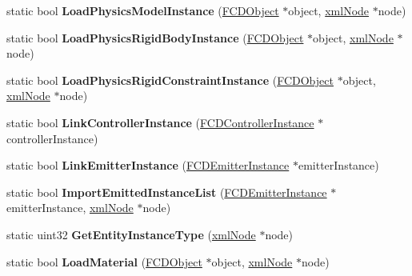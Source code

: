 \begin{DoxyCompactItemize}
\item 
\hypertarget{classFArchiveXML_a601db1bc80cc144e179fef96dd82f6dc}{
static bool {\bfseries LoadPhysicsModelInstance} (\hyperlink{classFCDObject}{FCDObject} $\ast$object, \hyperlink{struct__xmlNode}{xmlNode} $\ast$node)}
\label{classFArchiveXML_a601db1bc80cc144e179fef96dd82f6dc}

\item 
\hypertarget{classFArchiveXML_a844e802b67f84ad81301a339e76d3b7b}{
static bool {\bfseries LoadPhysicsRigidBodyInstance} (\hyperlink{classFCDObject}{FCDObject} $\ast$object, \hyperlink{struct__xmlNode}{xmlNode} $\ast$node)}
\label{classFArchiveXML_a844e802b67f84ad81301a339e76d3b7b}

\item 
\hypertarget{classFArchiveXML_a23d938ee0bf9e6a2b017646b639fee68}{
static bool {\bfseries LoadPhysicsRigidConstraintInstance} (\hyperlink{classFCDObject}{FCDObject} $\ast$object, \hyperlink{struct__xmlNode}{xmlNode} $\ast$node)}
\label{classFArchiveXML_a23d938ee0bf9e6a2b017646b639fee68}

\item 
\hypertarget{classFArchiveXML_aa02dcab5cfd175401750a05d992e1d2b}{
static bool {\bfseries LinkControllerInstance} (\hyperlink{classFCDControllerInstance}{FCDControllerInstance} $\ast$controllerInstance)}
\label{classFArchiveXML_aa02dcab5cfd175401750a05d992e1d2b}

\item 
\hypertarget{classFArchiveXML_a1c77296a350a216bafcd5275447d58fd}{
static bool {\bfseries LinkEmitterInstance} (\hyperlink{classFCDEmitterInstance}{FCDEmitterInstance} $\ast$emitterInstance)}
\label{classFArchiveXML_a1c77296a350a216bafcd5275447d58fd}

\item 
\hypertarget{classFArchiveXML_aa8f1c68e99ccbe83af81a014d7b81fb3}{
static bool {\bfseries ImportEmittedInstanceList} (\hyperlink{classFCDEmitterInstance}{FCDEmitterInstance} $\ast$emitterInstance, \hyperlink{struct__xmlNode}{xmlNode} $\ast$node)}
\label{classFArchiveXML_aa8f1c68e99ccbe83af81a014d7b81fb3}

\item 
\hypertarget{classFArchiveXML_a55429934b31d562678dbe3b6750785b7}{
static uint32 {\bfseries GetEntityInstanceType} (\hyperlink{struct__xmlNode}{xmlNode} $\ast$node)}
\label{classFArchiveXML_a55429934b31d562678dbe3b6750785b7}

\item 
\hypertarget{classFArchiveXML_a78515848c51397e3eb41b95a97eea267}{
static bool {\bfseries LoadMaterial} (\hyperlink{classFCDObject}{FCDObject} $\ast$object, \hyperlink{struct__xmlNode}{xmlNode} $\ast$node)}
\label{classFArchiveXML_a78515848c51397e3eb41b95a97eea267}


\end{DoxyCompactItemize}
